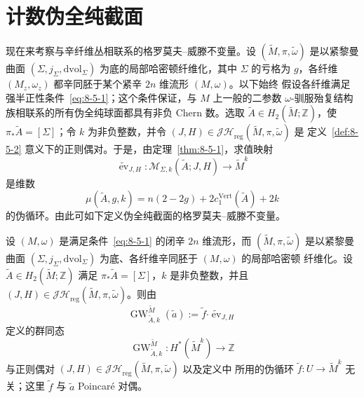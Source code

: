 
\section{计数伪全纯截面}\label{sec:8-6}

现在来考察与辛纤维丛相联系的格罗莫夫--威滕不变量。设
$(\widetilde M,\pi,\widetilde\omega)$ 是以紧黎曼曲面
$(\Sigma,j_\Sigma,\mathrm{dvol}_\Sigma)$ 为底的局部哈密顿纤维化，其中 $\Sigma$ 的亏格为
$g$，各纤维 $(M_z,\omega_z)$ 都辛同胚于某个紧辛 $2n$ 维流形 $(M,\omega)$。以下始终
假设各纤维满足强半正性条件~\eqref{eq:8-5-1}；这个条件保证，与 $M$ 上一般的二参数
$\omega$-驯服殆复结构族相联系的所有伪全纯球面都具有非负 Chern 数。选取
$\widetilde A\in H_2(\widetilde M;\mathbb Z)$，使
$\pi_*\widetilde A=[\Sigma]$；令 $k$ 为非负整数，并令
$(J,H)\in\mathcal{JH}_{\mathrm{reg}}(\widetilde M,\pi,\widetilde\omega)$ 是
定义~\ref{def:8-5-2} 意义下的正则偶对。于是，由定理~\ref{thm:8-5-1}，求值映射
\[
  \widetilde{\operatorname{ev}}_{J,H}:
  \mathcal M_{\Sigma,k}(\widetilde A;J,H)\longrightarrow\widetilde M^k
\]
是维数
\[
  \mu(\widetilde A,g,k)
  =n(2-2g)+2c_1^{\mathrm{Vert}}(\widetilde A)+2k
\]
的伪循环。由此可如下定义伪全纯截面的格罗莫夫--威滕不变量。

\begin{theorem}\label{thm:8-6-1}
设 $(M,\omega)$ 是满足条件~\eqref{eq:8-5-1} 的闭辛 $2n$ 维流形，而
$(\widetilde M,\pi,\widetilde\omega)$ 是以紧黎曼曲面
$(\Sigma,j_\Sigma,\mathrm{dvol}_\Sigma)$ 为底、各纤维辛同胚于 $(M,\omega)$ 的局部哈密顿
纤维化。设 $\widetilde A\in H_2(\widetilde M;\mathbb Z)$ 满足
$\pi_*\widetilde A=[\Sigma]$，$k$ 是非负整数，并且
$(J,H)\in\mathcal{JH}_{\mathrm{reg}}(\widetilde M,\pi,\widetilde\omega)$。则由
\begin{equation}\label{eq:8-6-1}
  \operatorname{GW}^{\widetilde M}_{\widetilde A,k}(\widetilde a)
  :=\widetilde f\mathbin{\boldsymbol\cdot}
    \widetilde{\operatorname{ev}}_{J,H}
\end{equation}
定义的群同态
\[
  \operatorname{GW}^{\widetilde M}_{\widetilde A,k}:
  H^*(\widetilde M^k)\longrightarrow\mathbb Z
\]
与正则偶对
$(J,H)\in\mathcal{JH}_{\mathrm{reg}}(\widetilde M,\pi,\widetilde\omega)$ 以及定义中
所用的伪循环
$\widetilde f:U\to\widetilde M^k$ 无关；这里 $\widetilde f$ 与
$\widetilde a$ Poincaré 对偶。
\end{theorem}

